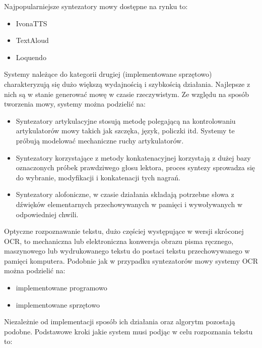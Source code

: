 Najpopularniejsze syntezatory mowy dostępne na rynku to:
\begin{itemize}
	\item IvonaTTS
	\item TextAloud
	\item Loquendo
\end{itemize}
Systemy należące do kategorii drugiej (implementowane sprzętowo) charakteryzują się dużo większą wydajnością i szybkością działania. Najlepsze z nich są w stanie generować mowę w czasie rzeczywistym. 
Ze względu na sposób tworzenia mowy, systemy można podzielić na:
\begin{itemize}
	\item Syntezatory artykulacyjne stosują metodę polegającą na kontrolowaniu artykulatorów mowy takich jak szczęka, język, policzki itd. Systemy te próbują modelować mechaniczne ruchy artykulatorów.
	\item Syntezatory korzystające z metody konkatenacyjnej korzystają z dużej bazy oznaczonych próbek prawdziwego głosu lektora, proces syntezy sprowadza się do wybranie, modyfikacji i konkatenacji tych nagrań. 
	\item Syntezatory alofoniczne, w czasie działania składają potrzebne słowa z dźwięków elementarnych przechowywanych w pamięci i wywoływanych w odpowiedniej chwili. 
\end{itemize}
Optyczne rozpoznawanie tekstu, dużo częściej występujące w wersji skróconej OCR, to mechaniczna lub elektroniczna konwersja obrazu pisma ręcznego, maszynowego lub wydrukowanego tekstu do postaci tekstu przechowywanego w pamięci komputera. Podobnie jak w przypadku syntezatorów mowy systemy OCR można podzielić na:
\begin{itemize}
	\item implementowane programowo
	\item implementowane sprzętowo
\end{itemize}
Niezależnie od implementacji sposób ich działania oraz algorytm pozostają podobne. Podstawowe kroki jakie system musi podjąc w celu rozpoznania tekstu to:
